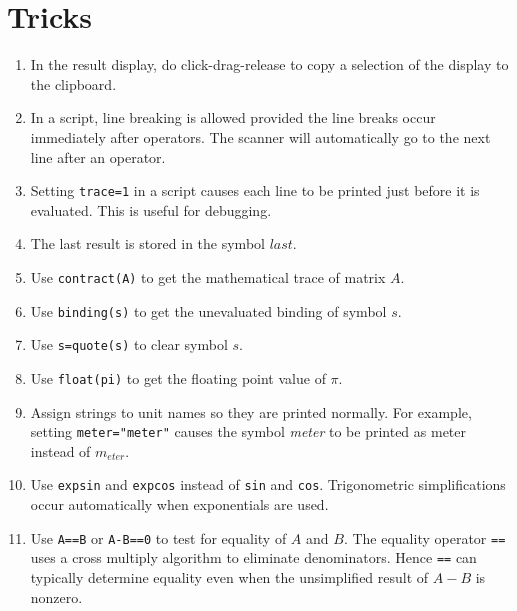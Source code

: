\section{Tricks}
\begin{enumerate}

\item
In the result display, do click-drag-release to copy a selection of the display to the clipboard.

\item
In a script, line breaking is allowed provided the line breaks occur immediately after operators.
The scanner will automatically go to the next line after an operator.

\item
Setting \verb$trace=1$ in a script causes each line to be printed just before it is evaluated.
This is useful for debugging.

\item
The last result is stored in the symbol $last$.

\item
Use \verb$contract(A)$ to get the mathematical trace of matrix $A$.

\item
Use \verb$binding(s)$ to get the unevaluated binding of symbol $s$.

\item
Use \verb$s=quote(s)$ to clear symbol $s$.

\item
Use \verb$float(pi)$ to get the floating point value of $\pi$.

\item
Assign strings to unit names so they are printed normally.
For example, setting \verb$meter="meter"$ causes the symbol {\it meter}
to be printed as meter instead of $m_{eter}$.

\item
Use \verb$expsin$ and \verb$expcos$ instead of \verb$sin$ and \verb$cos$.
Trigonometric simplifications occur automatically when exponentials are used.

\item
Use \verb$A==B$ or \verb$A-B==0$ to test for equality of $A$ and $B$.
The equality operator \verb$==$ uses a cross multiply algorithm to eliminate denominators.
Hence \verb$==$ can typically determine equality even when the unsimplified result of $A-B$ is nonzero.

\end{enumerate}
